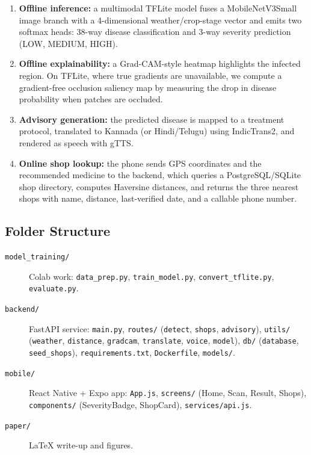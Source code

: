 \documentclass[11pt]{article}
\begin{document}
\begin{enumerate}
    \item \textbf{Offline inference:} a multimodal TFLite model fuses a MobileNetV3Small image branch with a 4-dimensional weather/crop-stage vector and emits two softmax heads: 38-way disease classification and 3-way severity prediction (LOW, MEDIUM, HIGH).
    \item \textbf{Offline explainability:} a Grad-CAM-style heatmap highlights the infected region. On TFLite, where true gradients are unavailable, we compute a gradient-free occlusion saliency map by measuring the drop in disease probability when patches are occluded.
    \item \textbf{Advisory generation:} the predicted disease is mapped to a treatment protocol, translated to Kannada (or Hindi/Telugu) using IndicTrans2, and rendered as speech with gTTS.
    \item \textbf{Online shop lookup:} the phone sends GPS coordinates and the recommended medicine to the backend, which queries a PostgreSQL/SQLite shop directory, computes Haversine distances, and returns the three nearest shops with name, distance, last-verified date, and a callable phone number.
\end{enumerate}

\subsection{Folder Structure}

\begin{description}
    \item[\texttt{model\_training/}] Colab work: \texttt{data\_prep.py}, \texttt{train\_model.py}, \texttt{convert\_tflite.py}, \texttt{evaluate.py}.
    \item[\texttt{backend/}] FastAPI service: \texttt{main.py}, \texttt{routes/} (\texttt{detect}, \texttt{shops}, \texttt{advisory}), \texttt{utils/} (\texttt{weather}, \texttt{distance}, \texttt{gradcam}, \texttt{translate}, \texttt{voice}, \texttt{model}), \texttt{db/} (\texttt{database}, \texttt{seed\_shops}), \texttt{requirements.txt}, \texttt{Dockerfile}, \texttt{models/}.
    \item[\texttt{mobile/}] React Native + Expo app: \texttt{App.js}, \texttt{screens/} (Home, Scan, Result, Shops), \texttt{components/} (SeverityBadge, ShopCard), \texttt{services/api.js}.
    \item[\texttt{paper/}] LaTeX write-up and figures.
\end{description}
\end{document}
